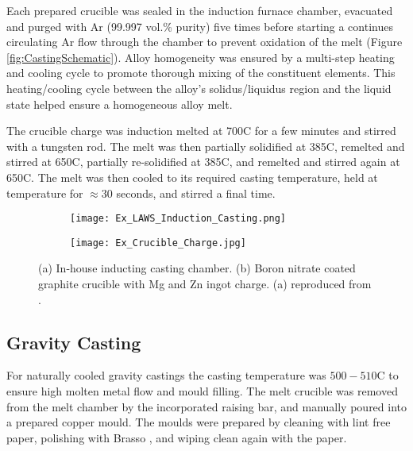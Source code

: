 Each prepared crucible was sealed in the induction furnace chamber, evacuated and purged with Ar (99.997 vol.\% purity) five times before starting a continues circulating Ar flow through the chamber to prevent oxidation of the melt (Figure \ref{fig:CastingSchematic}). Alloy homogeneity was ensured by a multi-step heating and cooling cycle to promote thorough mixing of the constituent elements. This heating/cooling cycle between the alloy's solidus/liquidus region and the liquid state helped ensure a homogeneous alloy melt.

The crucible charge was induction melted at 700\degree C for a few minutes and stirred with a tungsten rod. The melt was then partially solidified at 385\degree C, remelted and stirred at 650\degree C, partially re-solidified at 385\degree C, and remelted and stirred again at 650\degree C. The melt was then cooled to its required casting temperature, held at temperature for ${\approx} 30$ seconds, and stirred a final time.

\begin{figure}[htbp]
	\centering
	\begin{subfigure}[htbp]{0.49\textwidth}
		\texttt{[image: Ex\_LAWS\_Induction\_Casting.png]}
		\caption{}
		\label{fig:LawsCasting}
	\end{subfigure}
	\begin{subfigure}[htbp]{0.375\textwidth}
		\texttt{[image: Ex\_Crucible\_Charge.jpg]}
		\caption{}
		\label{fig:CrucibleCharge}
	\end{subfigure}
	\caption[(a) In-house inducting casting chamber. (b) Boron nitrate coated graphite crucible with Mg and Zn ingot charge.]{(a) In-house inducting casting chamber. (b) Boron nitrate coated graphite crucible with Mg and Zn ingot charge. (a) reproduced from \cite{Laws2007}.}%
	\label{fig:Induction}
\end{figure}

\subsection{Gravity Casting} \label{sec:MasterGravityCasting}

For naturally cooled gravity castings the casting temperature was $500- 510$\degree C to ensure high molten metal flow and mould filling. The melt crucible was removed from the melt chamber by the incorporated raising bar, and manually poured into a prepared copper mould. The moulds were prepared by cleaning with lint free paper, polishing with Brasso \textcopyright, and wiping clean again with the paper. 

